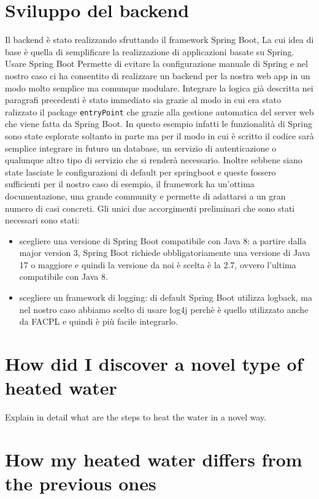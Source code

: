 \section{Sviluppo del backend}
Il backend è stato realizzando sfruttando il framework Spring Boot\cite{springboot}, La cui idea di base è quella di semplificare la realizzazione di applicazioni basate su Spring\cite{spring}. Usare Spring Boot Permette di evitare la configurazione manuale di Spring e nel nostro caso ci ha consentito di realizzare un backend per la nostra web app in un modo molto semplice ma comunque modulare. Integrare la logica già descritta nei paragrafi precedenti è stato immediato sia grazie al modo in cui era stato ralizzato il package \texttt{entryPoint} che grazie alla gestione automatica del server web che viene fatta da Spring Boot. In questo esempio infatti le funzionalità di Spring sono state esplorate soltanto in parte ma per il modo in cui è scritto il codice sarà semplice integrare in futuro un database, un servizio di autenticazione o qualunque altro tipo di servizio che si renderà necessario. Inoltre sebbene siano state lasciate le configurazioni di default per springboot e queste fossero sufficienti per il nostro caso di esempio, il framework ha un'ottima documentazione, una grande community e permette di adattarsi a un gran numero di casi concreti.\medbreak
Gli unici due accorgimenti preliminari che sono stati necessari sono stati:
\begin{itemize}
    \item scegliere una versione di Spring Boot compatibile con Java 8: a partire dalla major version 3, Spring Boot richiede obbligatoriamente una versione di Java 17 o maggiore e quindi la versione da noi è scelta è la 2.7, ovvero l'ultima compatibile con Java 8.
    \item scegliere un framework di logging: di default Spring Boot utilizza logback, ma nel nostro caso abbiamo scelto di usare log4j perchè è quello utilizzato anche da FACPL e quindi è più facile integrarlo.
\end{itemize}

\section{How did I discover a novel type of heated water}

Explain in detail what are the steps to heat the water in a novel way.

\section{How my heated water differs from the previous ones}

